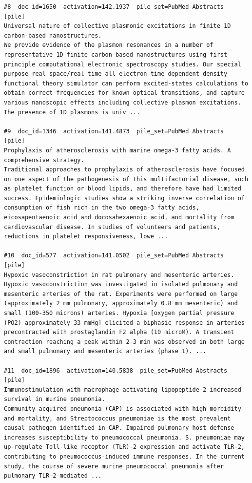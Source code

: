 \begin{verbatim}
#8  doc_id=1650  activation=142.1937  pile_set=PubMed Abstracts  [pile]
Universal nature of collective plasmonic excitations in finite 1D carbon-based nanostructures.
We provide evidence of the plasmon resonances in a number of representative 1D finite carbon-based nanostructures using first-principle computational electronic spectroscopy studies. Our special purpose real-space/real-time all-electron time-dependent density-functional theory simulator can perform excited-states calculations to obtain correct frequencies for known optical transitions, and capture various nanoscopic effects including collective plasmon excitations. The presence of 1D plasmons is univ ...

#9  doc_id=1346  activation=141.4873  pile_set=PubMed Abstracts  [pile]
Prophylaxis of atherosclerosis with marine omega-3 fatty acids. A comprehensive strategy.
Traditional approaches to prophylaxis of atherosclerosis have focused on one aspect of the pathogenesis of this multifactorial disease, such as platelet function or blood lipids, and therefore have had limited success. Epidemiologic studies show a striking inverse correlation of consumption of fish rich in the two omega-3 fatty acids, eicosapentaenoic acid and docosahexaenoic acid, and mortality from cardiovascular disease. In studies of volunteers and patients, reductions in platelet responsiveness, lowe ...

#10  doc_id=577  activation=141.0502  pile_set=PubMed Abstracts  [pile]
Hypoxic vasoconstriction in rat pulmonary and mesenteric arteries.
Hypoxic vasoconstriction was investigated in isolated pulmonary and mesenteric arteries of the rat. Experiments were performed on large (approximately 2 mm pulmonary, approximately 0.8 mm mesenteric) and small (100-350 microns) arteries. Hypoxia [oxygen partial pressure (PO2) approximately 33 mmHg] elicited a biphasic response in arteries precontracted with prostaglandin F2 alpha (10 microM). A transient contraction reaching a peak within 2-3 min was observed in both large and small pulmonary and mesenteric arteries (phase 1). ...

#11  doc_id=1896  activation=140.5838  pile_set=PubMed Abstracts  [pile]
Immunostimulation with macrophage-activating lipopeptide-2 increased survival in murine pneumonia.
Community-acquired pneumonia (CAP) is associated with high morbidity and mortality, and Streptococcus pneumoniae is the most prevalent causal pathogen identified in CAP. Impaired pulmonary host defense increases susceptibility to pneumococcal pneumonia. S. pneumoniae may up-regulate Toll-like receptor (TLR)-2 expression and activate TLR-2, contributing to pneumococcus-induced immune responses. In the current study, the course of severe murine pneumococcal pneumonia after pulmonary TLR-2-mediated ...


\end{verbatim}
